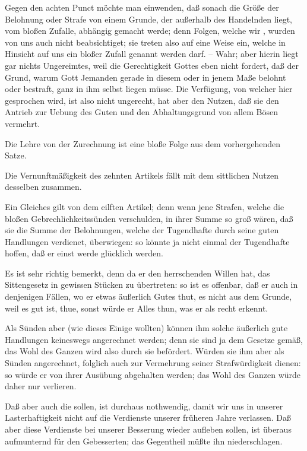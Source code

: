 \begin{aufza}
\item Gegen den achten Punct möchte man einwenden, daß sonach die Größe der Belohnung oder Strafe von einem Grunde, der außerhalb des Handelnden liegt, vom bloßen Zufalle, abhängig gemacht werde; denn Folgen, welche wir , wurden von uns auch nicht beabsichtiget; sie treten also auf eine Weise ein, welche in Hinsicht auf uns ein bloßer Zufall genannt werden darf. -- Wahr; aber hierin liegt gar nichts Ungereimtes, weil die Gerechtigkeit Gottes eben nicht fordert, daß der Grund, warum Gott Jemanden gerade in diesem oder in jenem Maße belohnt oder bestraft, ganz in ihm selbst liegen müsse. Die Verfügung, von welcher hier gesprochen wird, ist also nicht ungerecht, hat aber den Nutzen, daß sie den Antrieb zur Uebung des Guten und den Abhaltungsgrund von allem Bösen vermehrt.
\item Die Lehre von der Zurechnung  ist eine bloße Folge aus dem vorhergehenden Satze.
\item Die Vernunftmäßigkeit des zehnten Artikels fällt mit dem sittlichen Nutzen desselben zusammen.~
\item Ein Gleiches gilt von dem eilften Artikel; denn wenn jene Strafen, welche die bloßen Gebrechlichkeitssünden verschulden, in ihrer Summe so groß wären, daß sie die Summe der Belohnungen, welche der Tugendhafte durch seine guten Handlungen verdienet, überwiegen: so könnte ja nicht einmal der Tugendhafte hoffen, daß er einst werde glücklich werden.
\item Es ist sehr richtig bemerkt,  denn da er den herrschenden Willen hat, das Sittengesetz in gewissen Stücken zu übertreten: so ist es offenbar, daß er auch in denjenigen Fällen, wo er etwas äußerlich Gutes thut, es nicht aus dem Grunde, weil es gut ist, thue, sonst würde er Alles thun, was er als recht erkennt.
\begin{RWanm} 
Als Sünden aber (wie dieses Einige wollten) können ihm solche äußerlich gute Handlungen keineswegs angerechnet werden; denn sie sind ja dem Gesetze gemäß, das Wohl des Ganzen wird also durch sie befördert. Würden sie ihm aber als Sünden angerechnet, folglich auch zur Vermehrung seiner Strafwürdigkeit dienen: so würde er von ihrer Ausübung abgehalten werden; das Wohl des Ganzen würde daher nur verlieren. 
\end{RWanm}
\item Daß aber auch die  sollen, ist durchaus nothwendig, damit wir uns in unserer Lasterhaftigkeit nicht auf die Verdienste unserer früheren Jahre verlassen. Daß aber diese Verdienste bei unserer Besserung wieder aufleben sollen, ist überaus aufmunternd für den Gebesserten; das Gegentheil müßte ihn niederschlagen.

\end{aufza}
